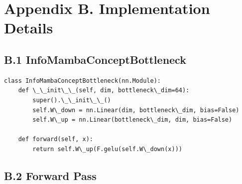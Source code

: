 \section{Appendix B. Implementation Details}

\subsection{B.1 InfoMambaConceptBottleneck}

\begin{lstlisting}
class InfoMambaConceptBottleneck(nn.Module):
    def \_\_init\_\_(self, dim, bottleneck\_dim=64):
        super().\_\_init\_\_()
        self.W\_down = nn.Linear(dim, bottleneck\_dim, bias=False)
        self.W\_up = nn.Linear(bottleneck\_dim, dim, bias=False)
    
    def forward(self, x):
        return self.W\_up(F.gelu(self.W\_down(x)))
\end{lstlisting}

\subsection{B.2 Forward Pass}

